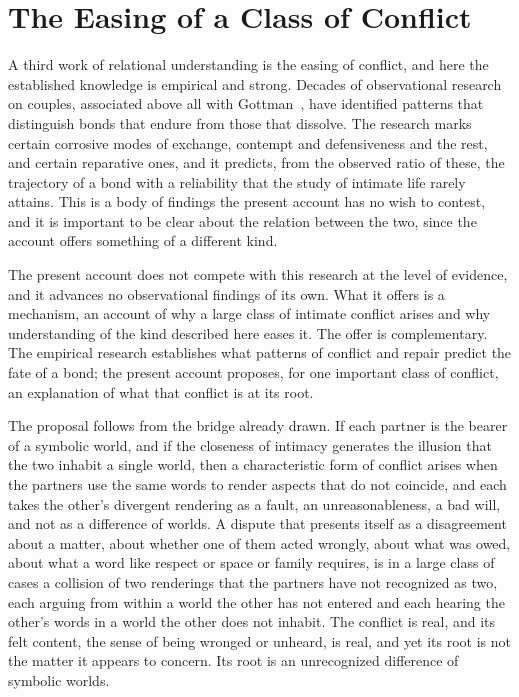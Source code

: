 \section{The Easing of a Class of Conflict}
\label{p27:sec:conflict}

\noindent
A third work of relational understanding is the easing of conflict, and here the established knowledge is empirical and strong. Decades of observational research on couples, associated above all with Gottman~\parencite{gottman1999marriage}, have identified patterns that distinguish bonds that endure from those that dissolve. The research marks certain corrosive modes of exchange, contempt and defensiveness and the rest, and certain reparative ones, and it predicts, from the observed ratio of these, the trajectory of a bond with a reliability that the study of intimate life rarely attains. This is a body of findings the present account has no wish to contest, and it is important to be clear about the relation between the two, since the account offers something of a different kind.

The present account does not compete with this research at the level of evidence, and it advances no observational findings of its own. What it offers is a mechanism, an account of why a large class of intimate conflict arises and why understanding of the kind described here eases it. The offer is complementary. The empirical research establishes what patterns of conflict and repair predict the fate of a bond; the present account proposes, for one important class of conflict, an explanation of what that conflict is at its root.

The proposal follows from the bridge already drawn. If each partner is the bearer of a symbolic world, and if the closeness of intimacy generates the illusion that the two inhabit a single world, then a characteristic form of conflict arises when the partners use the same words to render aspects that do not coincide, and each takes the other's divergent rendering as a fault, an unreasonableness, a bad will, and not as a difference of worlds. A dispute that presents itself as a disagreement about a matter, about whether one of them acted wrongly, about what was owed, about what a word like respect or space or family requires, is in a large class of cases a collision of two renderings that the partners have not recognized as two, each arguing from within a world the other has not entered and each hearing the other's words in a world the other does not inhabit. The conflict is real, and its felt content, the sense of being wronged or unheard, is real, and yet its root is not the matter it appears to concern. Its root is an unrecognized difference of symbolic worlds.

